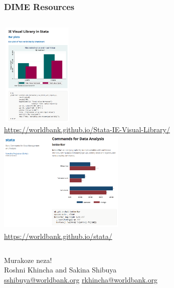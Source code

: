 \documentclass[10pt]{beamer}
\begin{document}
	\begin{frame}
	\frametitle{DIME Resources}
		\begin{center}
		\begin{columns}
		\includegraphics[height=5cm, width=3.5cm]{dime_resource_1} \\
		\tiny \url{https://worldbank.github.io/Stata-IE-Visual-Library/}
		\includegraphics[height=5cm, width=6cm]{dime_resource_2} \\
		\tiny \url{https://worldbank.github.io/stata/}
		\end{columns}	
		\end{center}
	\end{frame}
	
	\begin{frame}
		\begin{center}
			\Large Murakoze neza! \\
			\vspace{10mm}
			\normalsize Roshni Khincha and Sakina Shibuya \\
			\small \url{sshibuya@worldbank.org}
			\small \url{rkhincha@worldbank.org}			
		\end{center}
	\end{frame}	
	
	
\end{document}
